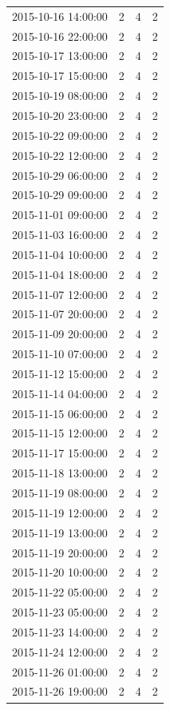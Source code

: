 \begin{tabular}{lrrr}
2015-10-16 14:00:00 & 2 & 4 & 2 \\
2015-10-16 22:00:00 & 2 & 4 & 2 \\
2015-10-17 13:00:00 & 2 & 4 & 2 \\
2015-10-17 15:00:00 & 2 & 4 & 2 \\
2015-10-19 08:00:00 & 2 & 4 & 2 \\
2015-10-20 23:00:00 & 2 & 4 & 2 \\
2015-10-22 09:00:00 & 2 & 4 & 2 \\
2015-10-22 12:00:00 & 2 & 4 & 2 \\
2015-10-29 06:00:00 & 2 & 4 & 2 \\
2015-10-29 09:00:00 & 2 & 4 & 2 \\
2015-11-01 09:00:00 & 2 & 4 & 2 \\
2015-11-03 16:00:00 & 2 & 4 & 2 \\
2015-11-04 10:00:00 & 2 & 4 & 2 \\
2015-11-04 18:00:00 & 2 & 4 & 2 \\
2015-11-07 12:00:00 & 2 & 4 & 2 \\
2015-11-07 20:00:00 & 2 & 4 & 2 \\
2015-11-09 20:00:00 & 2 & 4 & 2 \\
2015-11-10 07:00:00 & 2 & 4 & 2 \\
2015-11-12 15:00:00 & 2 & 4 & 2 \\
2015-11-14 04:00:00 & 2 & 4 & 2 \\
2015-11-15 06:00:00 & 2 & 4 & 2 \\
2015-11-15 12:00:00 & 2 & 4 & 2 \\
2015-11-17 15:00:00 & 2 & 4 & 2 \\
2015-11-18 13:00:00 & 2 & 4 & 2 \\
2015-11-19 08:00:00 & 2 & 4 & 2 \\
2015-11-19 12:00:00 & 2 & 4 & 2 \\
2015-11-19 13:00:00 & 2 & 4 & 2 \\
2015-11-19 20:00:00 & 2 & 4 & 2 \\
2015-11-20 10:00:00 & 2 & 4 & 2 \\
2015-11-22 05:00:00 & 2 & 4 & 2 \\
2015-11-23 05:00:00 & 2 & 4 & 2 \\
2015-11-23 14:00:00 & 2 & 4 & 2 \\
2015-11-24 12:00:00 & 2 & 4 & 2 \\
2015-11-26 01:00:00 & 2 & 4 & 2 \\
2015-11-26 19:00:00 & 2 & 4 & 2 \\

\end{tabular}
